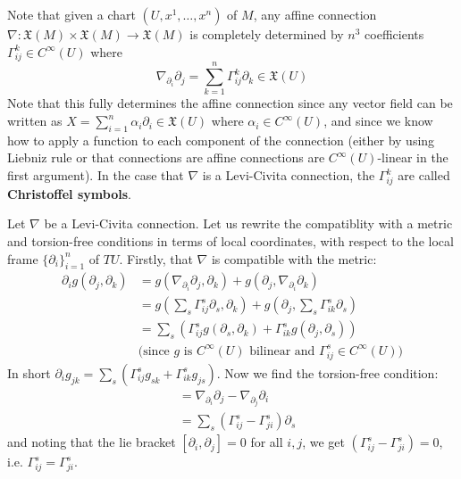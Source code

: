 \documentclass[a4paper]{article}
\theoremstyle{definition} \newtheorem*{definition}{Definition}
\theoremstyle{definition} \newtheorem*{definitions}{Definitions}
\theoremstyle{plain} \newtheorem{theorem}{Theorem}[section]
\theoremstyle{plain} \newtheorem{proposition}[theorem]{Proposition}
\theoremstyle{plain} \newtheorem{corollary}[theorem]{Corollary}
\theoremstyle{plain} \newtheorem{lemma}[theorem]{Lemma}
\theoremstyle{plain} \newtheorem{example}[theorem]{Example}
\newcommand{\defn}[1]{\textbf{#1}}
\begin{document}
Note that given a chart $(U, x^1, \ldots, x^n)$ of $M$, any affine connection $\nabla:\mathfrak{X}(M)\times \mathfrak{X}(M)\to \mathfrak{X}(M)$ is completely determined by $n^3$ coefficients $\Gamma^k_{ij}\in C^\infty (U)$ where
$$\nabla_{\partial_i}\partial_j=\sum_{k=1}^n \Gamma^k_{ij} \partial_k \in \mathfrak{X}(U)$$
Note that this fully determines the affine connection since any vector field can be written as $X=\sum_{i=1}^n \alpha_i \partial_i\in \mathfrak{X}(U)$ where $\alpha_i\in C^\infty (U)$, and since we know how to apply a function to each component of the connection (either by using Liebniz rule or that connections are affine connections are $C^\infty(U)$-linear in the first argument). In the case that $\nabla$ is a Levi-Civita connection, the $\Gamma^k_{ij}$ are called \defn{Christoffel symbols}.

Let $\nabla$ be a Levi-Civita connection. Let us rewrite the compatiblity with a metric and torsion-free conditions in terms of local coordinates, with respect to the local frame $\{\partial_i\}_{i=1}^n$ of $TU$. Firstly, that $\nabla$ is compatible with the metric:
\begin{align*}
    \partial_i g(\partial_j, \partial_k) & = g(\nabla_{\partial_i}\partial_j, \partial_k) + g(\partial_j, \nabla_{\partial_i}\partial_k) \\
    & = g(\sum_s \Gamma^s_{ij}\partial_s, \partial_k)+g(\partial_j, \sum_s \Gamma^s_{ik}\partial_s)\\
    &= \sum_s (\Gamma^s_{ij}g(\partial_s, \partial_k)+\Gamma^s_{ik}g(\partial_j, \partial_s)) \\ & \textrm{(since $g$ is $C^\infty(U)$ bilinear and $\Gamma^s_{ij}\in C^\infty(U)$)}
\end{align*}
In short $\partial_i g_{jk} = \sum_s (\Gamma^s_{ij}g_{sk}+\Gamma^s_{ik}g_{js})$. Now we find the torsion-free condition:
\begin{align*}
    [\partial_i, \partial_j] & = \nabla_{\partial_i}\partial_j - \nabla_{\partial_j}\partial_i \\
    & = \sum_s (\Gamma^s_{ij} - \Gamma^s_{ji})\partial_s
\end{align*}
and noting that the lie bracket $[\partial_i, \partial_j]=0$ for all $i,j$, we get $(\Gamma^s_{ij} - \Gamma^s_{ji})=0$, i.e. $\Gamma^s_{ij}=\Gamma^s_{ji}$.
\end{document}
